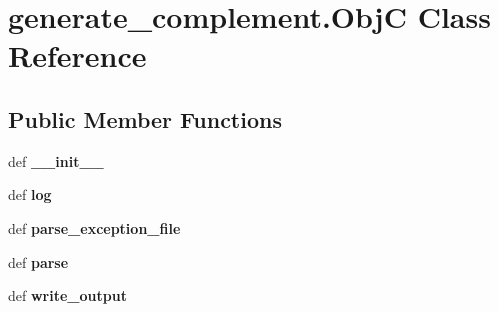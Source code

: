 \hypertarget{classgenerate__complement_1_1_obj_c}{\section{generate\-\_\-complement.\-Obj\-C Class Reference}
\label{classgenerate__complement_1_1_obj_c}
}
\subsection*{Public Member Functions}
\begin{DoxyCompactItemize}
\item 
\hypertarget{classgenerate__complement_1_1_obj_c_ac958a7e73dd6c9cc3f0593e997618977}{def {\bfseries \-\_\-\-\_\-init\-\_\-\-\_\-}}\label{classgenerate__complement_1_1_obj_c_ac958a7e73dd6c9cc3f0593e997618977}

\item 
\hypertarget{classgenerate__complement_1_1_obj_c_a11e7b13f612f80d5c43cc357533417a9}{def {\bfseries log}}\label{classgenerate__complement_1_1_obj_c_a11e7b13f612f80d5c43cc357533417a9}

\item 
\hypertarget{classgenerate__complement_1_1_obj_c_a7f25fb93b3ae25378b2e60a124f7a77d}{def {\bfseries parse\-\_\-exception\-\_\-file}}\label{classgenerate__complement_1_1_obj_c_a7f25fb93b3ae25378b2e60a124f7a77d}

\item 
\hypertarget{classgenerate__complement_1_1_obj_c_a51d0503b7cd8d922ac108c0821743cbe}{def {\bfseries parse}}\label{classgenerate__complement_1_1_obj_c_a51d0503b7cd8d922ac108c0821743cbe}

\item 
\hypertarget{classgenerate__complement_1_1_obj_c_ad161201c6817e8428c30f6db55ad6645}{def {\bfseries write\-\_\-output}}\label{classgenerate__complement_1_1_obj_c_ad161201c6817e8428c30f6db55ad6645}

\end{DoxyCompactItemize}
